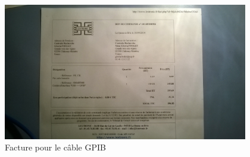 \label{annexe_factures}

\begin{figure}
  \begin{center}
		\includegraphics[height=6cm]{./images/facture.jpg}
		\caption{Facture pour le c\^able GPIB}
		\label{facture}
	\end{center}
\end{figure}